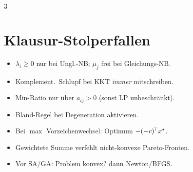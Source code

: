 \documentclass[8pt,a4paper]{extarticle}
\begin{document}
\begin{multicols*}{3}
\section{Klausur-Stolperfallen}
\begin{itemize}
\item $\lambda_i\ge 0$ nur bei Ungl.-NB; $\mu_j$ frei bei Gleichungs-NB.
\item Komplement.\ Schlupf bei KKT \emph{immer} mitschreiben.
\item Min-Ratio nur \"uber $a_{ij}>0$ (sonst LP unbeschr\"ankt).
\item Bland-Regel bei Degeneration aktivieren.
\item Bei $\max$ Vorzeichenwechsel: Optimum $-(-c)^{\!\top} x^\star$.
\item Gewichtete Summe verfehlt nicht-konvexe Pareto-Fronten.
\item Vor SA/GA: Problem konvex? dann Newton/BFGS.
\end{itemize}

\end{multicols*}
\end{document}

